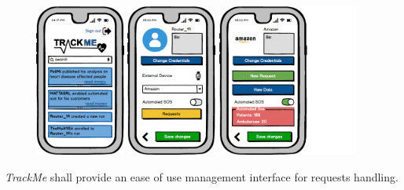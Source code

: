 \documentclass[a4paper]{article}
\begin{document}
        \begin{figure}[!htpb]
    	\centering
    	\includegraphics[height=50mm]{images/mockups/HomePage.png}
    	\includegraphics[height=50mm]{images/mockups/IndividualProfile.png}
    	\includegraphics[height=50mm]{images/mockups/ThirdPartyProfile.png}
        \end{figure}
        \newpage
        \textit{TrackMe} shall provide an ease of use management interface for requests handling.
\end{document}
